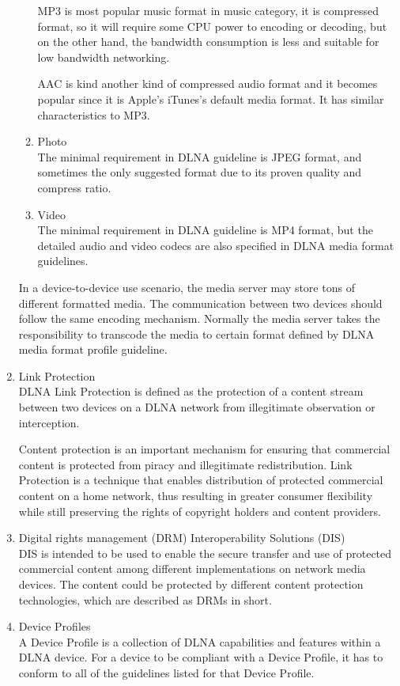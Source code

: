 \begin{enumerate}
\begin{enumerate}
MP3 is most popular music format in music category, it is compressed format, so it will require 
some CPU power to encoding or decoding, but on the other hand, the bandwidth consumption is less 
and suitable for low bandwidth networking.

AAC is kind another kind of compressed audio format and it becomes popular since it is Apple's 
iTunes's default media format. It has similar characteristics to MP3.
\item Photo \\
The minimal requirement in DLNA guideline is JPEG format, and sometimes the only
suggested format due to its proven quality and compress ratio.
\item Video \\
The minimal requirement in DLNA guideline is MP4 format, but the detailed audio and video codecs 
are also specified in DLNA media format guidelines.
\end{enumerate}
In a device-to-device use scenario, the media server may store tons of different
formatted media. The communication between two devices should follow the same encoding mechanism. Normally 
the media server takes the responsibility to transcode the media to certain format defined by 
DLNA media format profile guideline. 
\item Link Protection \\
DLNA Link Protection is defined as the protection of a content stream between two 
devices on a DLNA network from illegitimate observation or interception.

Content protection is an important mechanism for ensuring that commercial content is protected 
from piracy and illegitimate redistribution. Link Protection is a technique that enables 
distribution of protected commercial content on a home network, thus resulting in greater 
consumer flexibility while still preserving the rights of copyright holders and content providers.
\item Digital rights management (DRM) Interoperability Solutions (DIS) \\
DIS is intended to be used to enable the secure transfer and use of protected
commercial content among different implementations on network media devices.
The content could be protected by different content protection technologies,
which are described as DRMs in short.
\item Device Profiles \\
A Device Profile is a collection of DLNA capabilities and features within a DLNA device. For a device 
to be compliant with a Device Profile, it has to conform to all of the guidelines listed for that 
Device Profile.


\end{enumerate}

